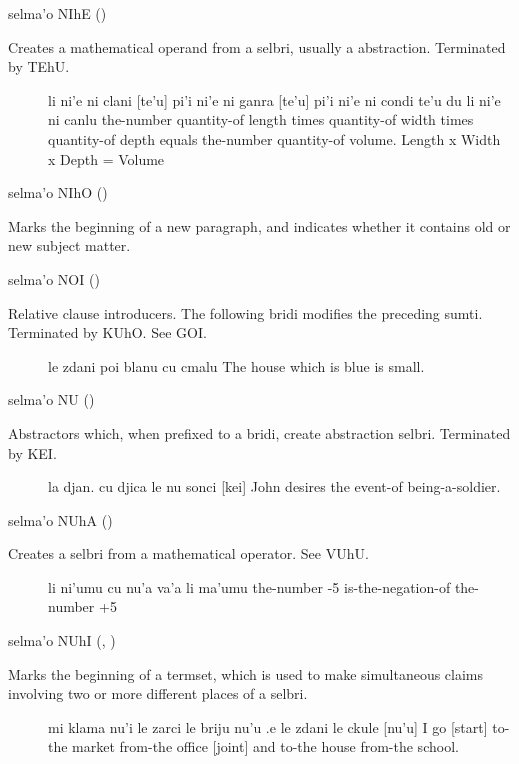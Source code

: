 selma'o NIhE () 

Creates a mathematical operand from a selbri, usually a
     abstraction. Terminated by TEhU.
\begin{description}
\item[] li ni'e ni clani [te'u] pi'i ni'e ni ganra [te'u] pi'i ni'e ni condi te'u du li ni'e ni canlu the-number quantity-of length times quantity-of width times quantity-of depth equals the-number quantity-of volume. Length x Width x Depth = Volume
\end{description}

selma'o NIhO () 

Marks the beginning of a new paragraph, and indicates
    whether it contains old or new subject matter.

selma'o NOI ()

Relative clause introducers. The following bridi modifies
    the preceding sumti. Terminated by KUhO. See GOI.
\begin{description}
\item[] le zdani poi blanu cu cmalu The house which is blue is small.
\end{description}

selma'o NU () 

Abstractors which, when prefixed to a bridi, create
    abstraction selbri. Terminated by KEI.
\begin{description}
\item[] la djan. cu djica le nu sonci [kei] John desires the event-of being-a-soldier.
\end{description}

selma'o NUhA () 

Creates a selbri from a mathematical operator. See VUhU.
\begin{description}
\item[] li ni'umu cu nu'a va'a li ma'umu the-number -5 is-the-negation-of the-number +5
\end{description}

selma'o NUhI (, ) 

Marks the beginning of a termset, which is used to make
    simultaneous claims involving two or more different places of a
    selbri.
\begin{description}
\item[] mi klama nu'i le zarci le briju nu'u .e le zdani le ckule [nu'u] I go [start] to-the market from-the office [joint] and to-the house from-the school.
\end{description}

